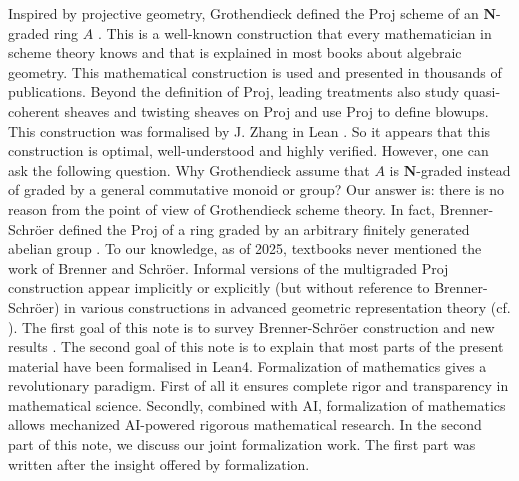 \documentclass[graybox]{svmult}
\begin{document}
Inspired by projective geometry, Grothendieck defined the Proj scheme of an $\mathbf{N}$-graded ring $A$ \cite{Gr61}. This is a well-known construction that every mathematician in scheme theory knows and that is explained in most books about algebraic geometry. This mathematical construction is used and presented in thousands of publications. 
Beyond the definition of Proj, leading treatments also study quasi-coherent sheaves and twisting sheaves on Proj and use Proj to define blowups.  
This construction was formalised by J. Zhang in Lean \cite{Z23}. 
So it appears that this construction is optimal, well-understood and highly verified.  
However, one can ask the following question. Why Grothendieck assume that $A$ is $\mathbf{N}$-graded instead of graded by a general commutative monoid or group? 
Our answer is: there is no reason from the point of view of Grothendieck scheme theory. In fact, Brenner-Schröer defined the Proj of a ring graded by an arbitrary finitely generated abelian group \cite{BS03}.
To our knowledge, as of 2025, textbooks never mentioned the work of Brenner and Schröer.
 Informal versions of the multigraded Proj construction appear implicitly or
explicitly (but without reference to Brenner-Schröer) in various constructions in advanced geometric representation theory (cf. \cite{MR24}).
The first goal of this note is to survey Brenner-Schröer construction and new results \cite{BS03, MR24, MZ25}. The second goal of this note is to explain that most parts of the present material have been formalised in Lean4. Formalization of mathematics gives a revolutionary paradigm. First of all it ensures complete rigor and transparency in mathematical science. Secondly, combined with AI, formalization of mathematics allows mechanized AI-powered rigorous mathematical research. In the second part of this note, we discuss our joint formalization work. The first part was written after the insight offered by formalization. 
\end{document}
